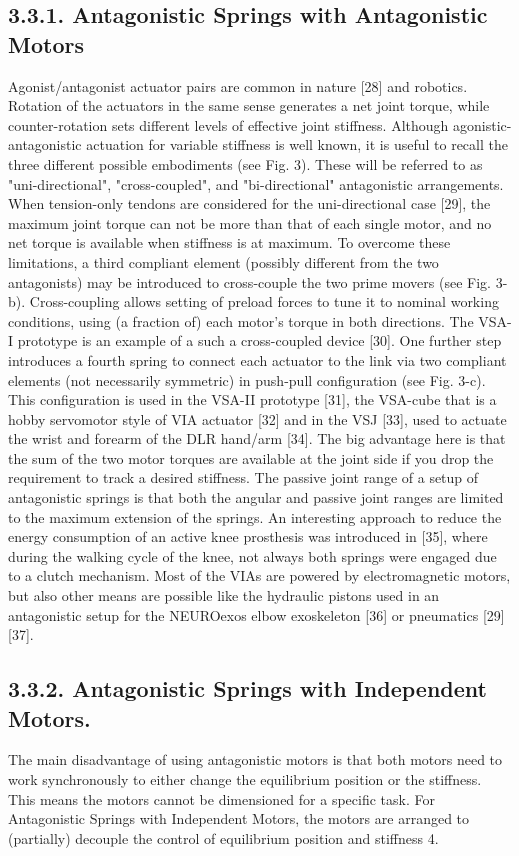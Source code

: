 \documentclass[10pt]{article}
\begin{document}
\subsection*{3.3.1. Antagonistic Springs with Antagonistic Motors}
Agonist/antagonist actuator pairs are common in nature [28] and robotics. Rotation of the actuators in the same sense generates a net joint torque, while\\[0pt]
counter-rotation sets different levels of effective joint stiffness. Although agonistic-antagonistic actuation for variable stiffness is well known, it is useful to recall the three different possible embodiments (see Fig. 3). These will be referred to as "uni-directional", "cross-coupled", and "bi-directional" antagonistic arrangements. When tension-only tendons are considered for the uni-directional case [29], the maximum joint torque can not be more than that of each single motor, and no net torque is available when stiffness is at maximum. To overcome these limitations, a third compliant element (possibly different from the two antagonists) may be introduced to cross-couple the two prime movers (see Fig. 3-b). Cross-coupling allows setting of preload forces to tune it to nominal working conditions, using (a fraction of) each motor's torque in both directions. The VSA-I prototype is an example of a such a cross-coupled device [30]. One further step introduces a fourth spring to connect each actuator to the link via two compliant elements (not necessarily symmetric) in push-pull configuration (see Fig. 3-c). This configuration is used in the VSA-II prototype [31], the VSA-cube that is a hobby servomotor style of VIA actuator [32] and in the VSJ [33], used to actuate the wrist and forearm of the DLR hand/arm [34]. The big advantage here is that the sum of the two motor torques are available at the joint side if you drop the requirement to track a desired stiffness. The passive joint range of a setup of antagonistic springs is that both the angular and passive joint ranges are limited to the maximum extension of the springs. An interesting approach to reduce the energy consumption of an active knee prosthesis was introduced in [35], where during the walking cycle of the knee, not always both springs were engaged due to a clutch mechanism. Most of the VIAs are powered by electromagnetic motors, but also other means are possible like the hydraulic pistons used in an antagonistic setup for the NEUROexos elbow exoskeleton [36] or pneumatics [29] [37].

\subsection*{3.3.2. Antagonistic Springs with Independent Motors.}
The main disadvantage of using antagonistic motors is that both motors need to work synchronously to either change the equilibrium position or the stiffness. This means the motors cannot be dimensioned for a specific task. For Antagonistic Springs with Independent Motors, the motors are arranged to (partially) decouple the control of equilibrium position and stiffness 4.
\end{document}
